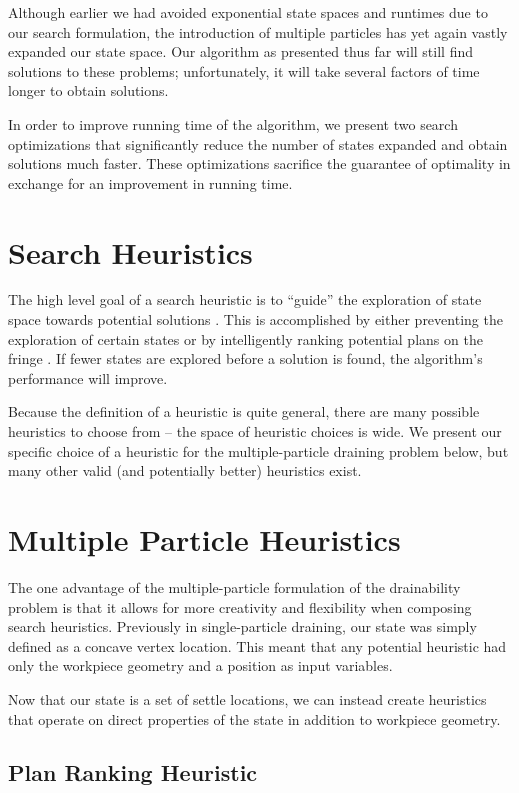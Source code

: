 Although earlier we had avoided exponential state spaces and runtimes due to our search formulation, the introduction of multiple particles has yet again vastly expanded our state space. Our algorithm as presented thus far will still find solutions to these problems; unfortunately, it will take several factors of time longer to obtain solutions.

In order to improve running time of the algorithm, we present two search optimizations that significantly reduce the number of states expanded and obtain solutions much faster. These optimizations sacrifice the guarantee of optimality in exchange for an improvement in running time.

\section{Search Heuristics}

The high level goal of a search heuristic is to ``guide'' the exploration of state space towards potential solutions \cite{AIBook}. This is accomplished by either preventing the exploration of certain states or by intelligently ranking potential plans on the fringe \cite{AIBook}. If fewer states are explored before a solution is found, the algorithm's performance will improve.

Because the definition of a heuristic is quite general, there are many possible heuristics to choose from -- the space of heuristic choices is wide. We present our specific choice of a heuristic for the multiple-particle draining problem below, but many other valid (and potentially better) heuristics exist.

\section{Multiple Particle Heuristics}

The one advantage of the multiple-particle formulation of the drainability problem is that it allows for more creativity and flexibility when composing search heuristics. Previously in single-particle draining, our state was simply defined as a concave vertex location. This meant that any potential heuristic had only the workpiece geometry and a position as input variables.

Now that our state is a set of settle locations, we can instead create heuristics that operate on direct properties of the state in addition to workpiece geometry.

\subsection{Plan Ranking Heuristic}

